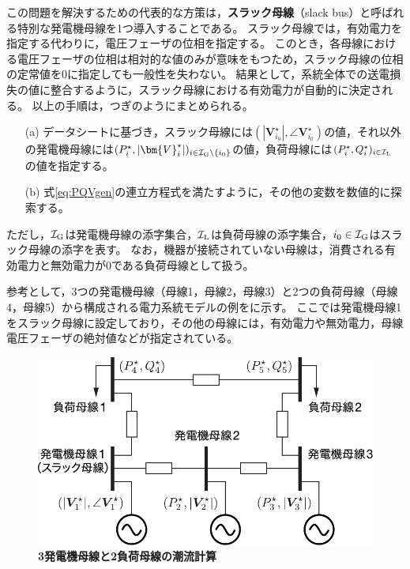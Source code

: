 \documentclass[tombow,dvipdfmx]{corona-a5-1.1}
\begin{document}
この問題を解決するための代表的な方策は，\textbf{スラック母線}（slack bus）と呼ばれる特別な発電機母線を1つ導入することである。
スラック母線では，有効電力を指定する代わりに，電圧フェーザの位相を指定する。
このとき，各母線における電圧フェーザの位相は相対的な値のみが意味をもつため，スラック母線の位相の定常値を0に指定しても一般性を失わない。
結果として，系統全体での送電損失の値に整合するように，スラック母線における有効電力が自動的に決定される。
以上の手順は，つぎのようにまとめられる。
\begin{itemize}
\item[(a)] データシートに基づき，スラック母線には$(|\bm{V}_{i_0}^{\star}|,\angle \bm{V}_{i_0}^{\star})$の値，それ以外の発電機母線には$(P_i^{\star},|\bm{V}_{i}^{\star}|)_{i \in \mathcal{I}_{\rm G}\setminus\{i_0\} }$の値，負荷母線には$(P_i^{\star},Q_i^{\star})_{i \in \mathcal{I}_{\rm L}}$の値を指定する。
\item[(b)] 式\ref{eq:PQVgen}の連立方程式を満たすように，その他の変数を数値的に探索する。
\end{itemize}
ただし，$\mathcal{I}_{\rm G}$は発電機母線の添字集合，$\mathcal{I}_{\rm L}$は負荷母線の添字集合，$i_0 \in \mathcal{I}_{\rm G}$はスラック母線の添字を表す。
なお，機器が接続されていない母線は，消費される有効電力と無効電力が0である負荷母線として扱う。

参考として，3つの発電機母線（母線1，母線2，母線3）と2つの負荷母線（母線4，母線5）から構成される電力系統モデルの例をに示す。
ここでは発電機母線1をスラック母線に設定しており，その他の母線には，有効電力や無効電力，母線電圧フェーザの絶対値などが指定されている。

\begin{figure}[t]
\centering
\includegraphics[width = .7\linewidth]{figs/powerflow}
\medskip
\caption{\textbf{3発電機母線と2負荷母線の潮流計算}}
\label{fig:powerflow}
\medskip
\end{figure}
\end{document}
